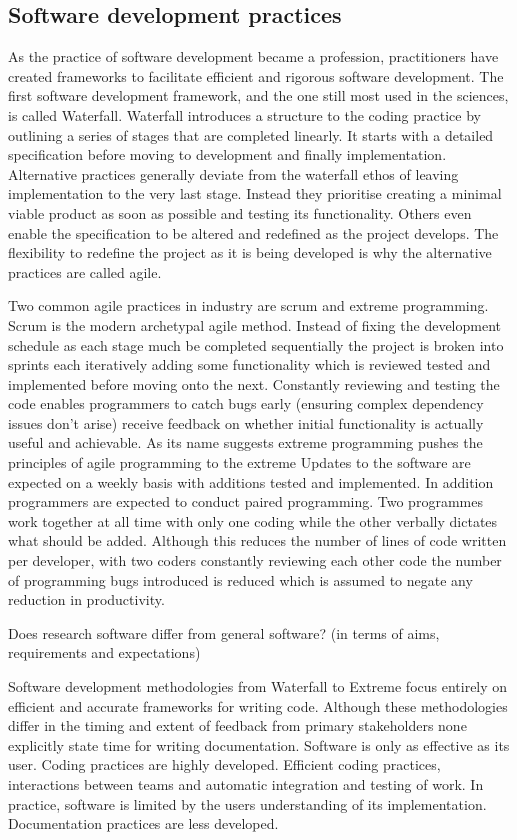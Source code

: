 \documentclass[../main.tex]{subfiles}
\begin{document}
\subsection{Software development practices}

As the practice of software development became a profession, practitioners have created frameworks to facilitate efficient and rigorous software development.
The first software development framework, and the one still most used in the sciences, is called Waterfall.
Waterfall introduces a structure to the coding practice by outlining a series of stages that are completed linearly.
It starts with a detailed specification before moving to development and finally implementation.
Alternative practices generally deviate from the waterfall ethos of leaving implementation to the very last stage.
Instead they prioritise creating a minimal viable product as soon as possible and testing its functionality.
Others even enable the specification to be altered and redefined as the project develops.
The flexibility to redefine the project as it is being developed is why the alternative practices are called agile. 

Two common agile practices in industry are scrum and extreme programming.
Scrum is the modern archetypal agile method.
Instead of fixing the development schedule as each stage much be completed sequentially the project is broken into sprints each iteratively adding some functionality which is reviewed tested and implemented before moving onto the next.
Constantly reviewing and testing the code enables programmers to catch bugs early (ensuring complex dependency issues don't arise) receive feedback on whether initial functionality is actually useful and achievable.
As its name suggests extreme programming pushes the principles of agile programming to the extreme
Updates to the software are expected on a weekly basis with additions tested and implemented. 
In addition programmers are expected to conduct paired programming. 
Two programmes work together at all time with only one coding while the other verbally dictates what should be added. 
Although this reduces the number of lines of code written per developer, with two coders constantly reviewing each other code the number of programming bugs introduced is reduced which is assumed to negate any reduction in productivity.

Does research software differ from general software? (in terms of aims, requirements and expectations)

Software development methodologies from Waterfall to Extreme focus entirely on efficient and accurate frameworks for writing code. 
Although these methodologies differ in the timing and extent of feedback from primary stakeholders none explicitly state time for writing documentation. 
Software is only as effective as its user.
Coding practices are highly developed. Efficient coding practices, interactions between teams and automatic integration and testing of work. In practice, software is limited by the users understanding of its implementation.
Documentation practices are less developed.
\end{document}
